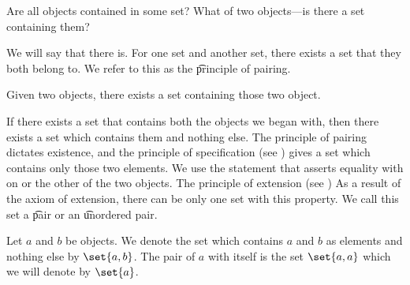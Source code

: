

Are all objects contained in some set?
What of two objects---is there a set containing them?


We will say that there is.
For one set and another set, there exists a set that they both belong to.
We refer to this as the \t{principle of pairing}.

\begin{principle}[Pairing]
	Given two objects, there exists a set containing those two object.
\end{principle}

If there exists a set that contains both the objects we began with, then there exists a set which contains them and nothing else.
The principle of pairing dictates existence, and the principle of specification (see ) gives a set which contains only those two elements.
We use the statement that asserts equality with on or the other of the two objects.
The principle of extension (see ) As a result of the axiom of extension, there can be only one set with this property.
We call this set a \t{pair} or an \t{unordered pair}.


Let $a$ and $b$ be objects.
We denote the set which contains $a$ and $b$ as elements and nothing else by $\set{a, b}$.
The pair of $a$ with itself is the set $\set{a, a}$ which we will denote by $\set{a}$.

\blankpage
